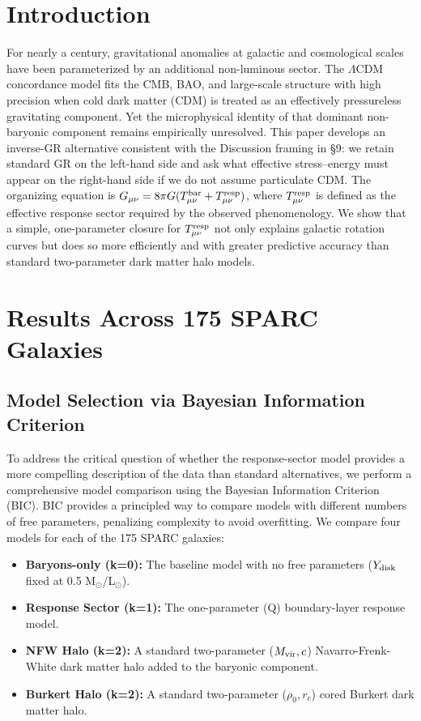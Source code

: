 \documentclass[12pt,onecolumn]{aastex631}
\newcommand{\tresp}{T^{\rm resp}_{\mu\nu}}
\newcommand{\tbar}{T^{\rm bar}_{\mu\nu}}
\begin{document}
\section{Introduction}
For nearly a century, gravitational anomalies at galactic and cosmological scales have been parameterized by an additional non-luminous sector. The \(\Lambda\)CDM concordance model fits the CMB, BAO, and large-scale structure with high precision when cold dark matter (CDM) is treated as an effectively pressureless gravitating component. Yet the microphysical identity of that dominant non-baryonic component remains empirically unresolved. This paper develops an inverse-GR alternative consistent with the Discussion framing in \S9: we retain standard GR on the left-hand side and ask what effective stress–energy must appear on the right-hand side if we do not assume particulate CDM. The organizing equation is \(G_{\mu\nu} = 8\pi G(\tbar + \tresp)\), where \(\tresp\) is defined as the effective response sector required by the observed phenomenology. We show that a simple, one-parameter closure for \(\tresp\) not only explains galactic rotation curves but does so more efficiently and with greater predictive accuracy than standard two-parameter dark matter halo models.

\section{Results Across 175 SPARC Galaxies}

\subsection{Model Selection via Bayesian Information Criterion}
To address the critical question of whether the response-sector model provides a more compelling description of the data than standard alternatives, we perform a comprehensive model comparison using the Bayesian Information Criterion (BIC). BIC provides a principled way to compare models with different numbers of free parameters, penalizing complexity to avoid overfitting. We compare four models for each of the 175 SPARC galaxies:
\begin{itemize}
    \item \textbf{Baryons-only (k=0):} The baseline model with no free parameters (\(Y_{\rm disk}\) fixed at 0.5 M\(_\odot\)/L\(_\odot\)).
    \item \textbf{Response Sector (k=1):} The one-parameter (Q) boundary-layer response model.
    \item \textbf{NFW Halo (k=2):} A standard two-parameter (\(M_{\rm vir}, c\)) Navarro-Frenk-White dark matter halo added to the baryonic component.
    \item \textbf{Burkert Halo (k=2):} A standard two-parameter (\(\rho_0, r_c\)) cored Burkert dark matter halo.
\end{itemize}
\end{document}
